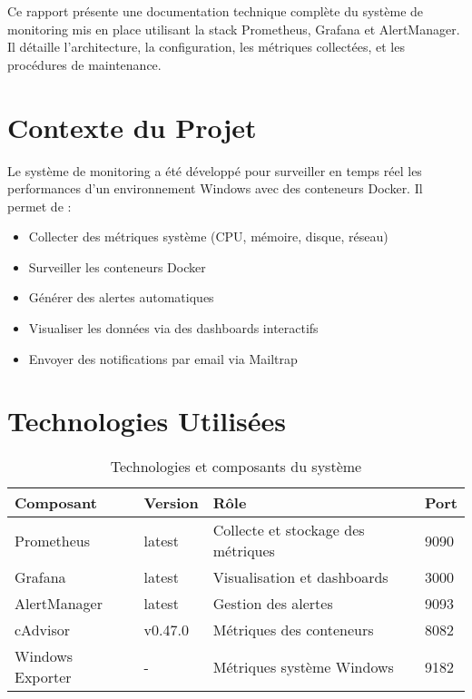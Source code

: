 \documentclass[12pt,a4paper]{report}
\begin{document}
Ce rapport présente une documentation technique complète du système de monitoring mis en place utilisant la stack Prometheus, Grafana et AlertManager. Il détaille l'architecture, la configuration, les métriques collectées, et les procédures de maintenance.

\section{Contexte du Projet}

Le système de monitoring a été développé pour surveiller en temps réel les performances d'un environnement Windows avec des conteneurs Docker. Il permet de :

\begin{itemize}
    \item Collecter des métriques système (CPU, mémoire, disque, réseau)
    \item Surveiller les conteneurs Docker
    \item Générer des alertes automatiques
    \item Visualiser les données via des dashboards interactifs
    \item Envoyer des notifications par email via Mailtrap
\end{itemize}

\section{Technologies Utilisées}

\begin{table}[H]
\centering
\begin{tabular}{|l|l|l|l|}
\hline
\textbf{Composant} & \textbf{Version} & \textbf{Rôle} & \textbf{Port} \\
\hline
Prometheus & latest & Collecte et stockage des métriques & 9090 \\
\hline
Grafana & latest & Visualisation et dashboards & 3000 \\
\hline
AlertManager & latest & Gestion des alertes & 9093 \\
\hline
cAdvisor & v0.47.0 & Métriques des conteneurs & 8082 \\
\hline
Windows Exporter & - & Métriques système Windows & 9182 \\
\hline
\end{tabular}
\caption{Technologies et composants du système}
\label{tab:technologies}
\end{table}
\end{document}
